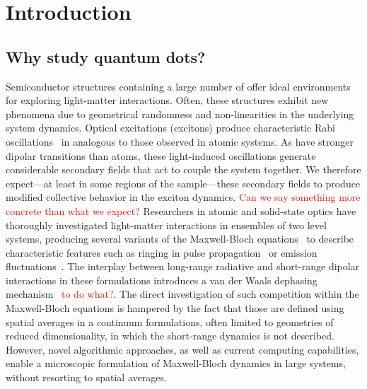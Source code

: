 \section{\label{section:introduction}Introduction}

\subsection{Why study quantum dots?}
Semiconductor structures containing a large number of \qds{} offer ideal environments for exploring light-matter interactions.
Often, these structures exhibit new phenomena due to geometrical randomness and non-linearities in the underlying system dynamics.
Optical excitations (excitons) produce characteristic Rabi oscillations~\cite{Stievater2001,Kamada2001,Htoon2002} in \qds{} analogous to those observed in atomic systems.
As \qds{} have stronger dipolar transitions than atoms, these light-induced oscillations generate considerable secondary fields that act to couple the system together.
We therefore expect---at least in some regions of the sample---these secondary fields to produce modified collective behavior in the exciton dynamics.
\textcolor{red}{Can we say something more concrete than what we expect?}
Researchers in atomic and solid-state optics have thoroughly investigated light-matter interactions in ensembles of two level systems, producing several variants of the Maxwell-Bloch equations~\cite{Gross1982} to describe characteristic features such as ringing in pulse propagation~\cite{Burnham1969,MacGillivray1976} or emission fluctuations~\cite{Haake1979}.
The interplay between long-range radiative and short-range dipolar interactions in these formulations introduces a van der Waals dephasing mechanism~\cite{Coffey1978} \textcolor{red}{to do what?}.
The direct investigation of such competition within the Maxwell-Bloch equations is hampered by the fact that those are defined using spatial averages in a continuum formulations, often limited to geometries of reduced dimensionality, in which the short-range dynamics is not described.
However, novel algorithmic approaches, as well as current computing capabilities, enable a microscopic formulation of Maxwell-Bloch dynamics in large systems, without resorting to spatial averages.

